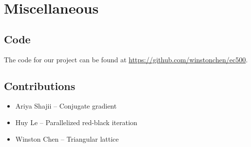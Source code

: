 \documentclass[paper=a4, fontsize=11pt]{scrartcl} %
\numberwithin{equation}{section} %
\numberwithin{figure}{section} %
\numberwithin{table}{section} %
\begin{document}
\section{Miscellaneous}
\subsection{Code}
The code for our project can be found at \url{https://github.com/winstonchen/ec500}.

\subsection{Contributions}
\begin{itemize}
	\item Ariya Shajii -- Conjugate gradient
	\item Huy Le -- Parallelized red-black iteration
	\item Winston Chen -- Triangular lattice
\end{itemize}
\end{document}
